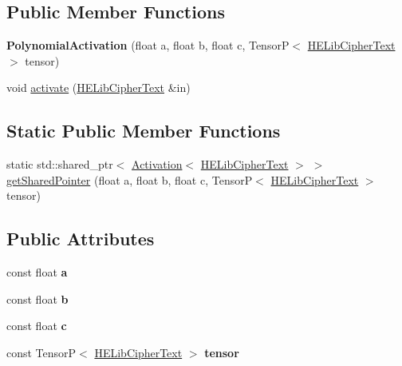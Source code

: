 \subsection*{Public Member Functions}
\begin{DoxyCompactItemize}
\item 
\mbox{\label{classPolynomialActivation_3_01HELibCipherText_01_4_ac2bd62e9d405fed932bc30dd87f85236}} 
{\bfseries Polynomial\+Activation} (float a, float b, float c, TensorP$<$ \hyperlink{classHELibCipherText}{H\+E\+Lib\+Cipher\+Text} $>$ tensor)
\item 
void \hyperlink{classPolynomialActivation_3_01HELibCipherText_01_4_a5d20f2ff5f59bcafe437d20942af7bec}{activate} (\hyperlink{classHELibCipherText}{H\+E\+Lib\+Cipher\+Text} \&in)
\end{DoxyCompactItemize}
\subsection*{Static Public Member Functions}
\begin{DoxyCompactItemize}
\item 
static std\+::shared\+\_\+ptr$<$ \hyperlink{classActivation}{Activation}$<$ \hyperlink{classHELibCipherText}{H\+E\+Lib\+Cipher\+Text} $>$ $>$ \hyperlink{classPolynomialActivation_3_01HELibCipherText_01_4_a1b8454b2fa856410cbc7619dba7e1b52}{get\+Shared\+Pointer} (float a, float b, float c, TensorP$<$ \hyperlink{classHELibCipherText}{H\+E\+Lib\+Cipher\+Text} $>$ tensor)
\end{DoxyCompactItemize}
\subsection*{Public Attributes}
\begin{DoxyCompactItemize}
\item 
\mbox{\label{classPolynomialActivation_3_01HELibCipherText_01_4_aed3a7116977caa5a97491582c0d57bf6}} 
const float {\bfseries a}
\item 
\mbox{\label{classPolynomialActivation_3_01HELibCipherText_01_4_a4da9ba91b618c98fdbe11544e5698f02}} 
const float {\bfseries b}
\item 
\mbox{\label{classPolynomialActivation_3_01HELibCipherText_01_4_a2ec2ebd2ef37bf139b954957127b60a0}} 
const float {\bfseries c}
\item 
\mbox{\label{classPolynomialActivation_3_01HELibCipherText_01_4_a12de3ad576ceb880577becc3d9317235}} 
const TensorP$<$ \hyperlink{classHELibCipherText}{H\+E\+Lib\+Cipher\+Text} $>$ {\bfseries tensor}
\end{DoxyCompactItemize}



